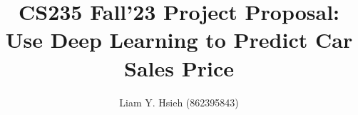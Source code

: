 \documentclass[manuscript,screen,review,nonacm]{acmart}
\begin{document}
\title{CS235 Fall'23 Project Proposal: Use Deep Learning to Predict Car Sales Price}

\author{Liam Y. Hsieh (862395843)}
\authorsaddresses{}






\end{document}
